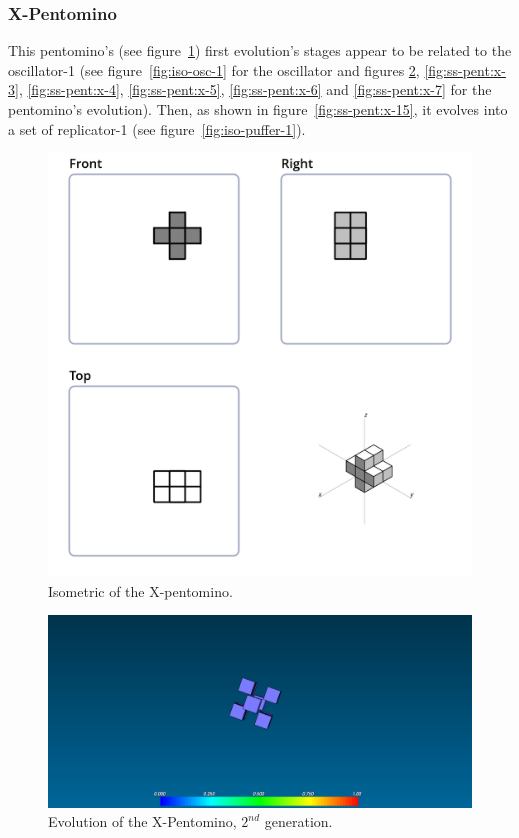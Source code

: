 \subsubsection{X-Pentomino}
\label{sec:x-pentomino}
This pentomino's (see figure~\ref{fig:iso-pent-x}) first evolution's stages
appear to be related to the oscillator-1 (see figure~\ref{fig:iso-osc-1} for the
oscillator and figures \ref{fig:ss-pent:x-2}, \ref{fig:ss-pent:x-3},
\ref{fig:ss-pent:x-4}, \ref{fig:ss-pent:x-5}, \ref{fig:ss-pent:x-6} and
\ref{fig:ss-pent:x-7} for the pentomino's evolution). Then, as shown in
figure~\ref{fig:ss-pent:x-15}, it evolves into a set of replicator-1 (see
figure~\ref{fig:iso-puffer-1}).

\begin{figure}
	\centering
	\includegraphics[scale=0.3]{iso_diagrams/x.png}
	\caption{Isometric of the X-pentomino.}
  \label{fig:iso-pent-x}
\end{figure}

\begin{figure}
	\centering
	\includegraphics[scale=0.3]{pentominoes_ss/x_2.png}
	\caption{Evolution of the X-Pentomino, $2^{nd}$ generation.}
	\label{fig:ss-pent:x-2}
\end{figure}

